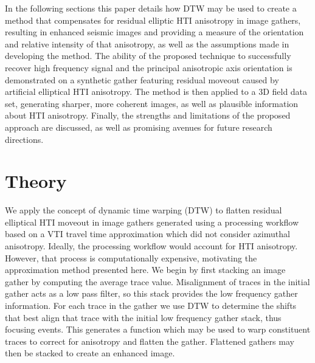 In the following sections this paper details how DTW may be used to create a method that compensates for residual elliptic HTI anisotropy in image gathers, resulting in enhanced seismic images and providing a measure of the orientation and relative intensity of that anisotropy, as well as the assumptions made in developing the method.  The ability of the proposed technique to successfully recover high frequency signal and the principal anisotropic axis orientation is demonstrated on a synthetic gather featuring  residual moveout caused by artificial elliptical HTI anisotropy. The method is then applied to a 3D field data set, generating sharper, more coherent images, as well as plausible information about HTI anisotropy.  Finally, the strengths and limitations of the proposed approach are discussed, as well as promising avenues for future research directions.

\section{Theory}

We apply the concept of dynamic time warping (DTW) to flatten residual elliptical HTI moveout in image gathers generated using a processing workflow based on a VTI travel time approximation which did not consider azimuthal anisotropy. Ideally, the processing workflow would account for HTI anisotropy.  However, that process is computationally expensive, motivating the approximation method presented here.  We begin  by first stacking an image gather by computing the average trace value.  Misalignment of traces in the initial gather acts as a low pass filter, so this stack provides the low frequency gather information.  For each trace in the gather we use DTW to determine the shifts that best align that trace with the initial low frequency gather stack, thus focusing events.  This generates a function which may be used to warp constituent traces to correct for anisotropy and flatten the gather. Flattened gathers may then be stacked to create an enhanced image.



